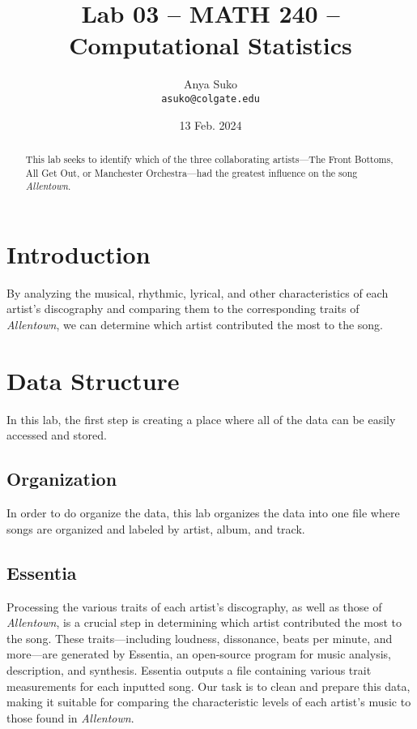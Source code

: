 \documentclass{article}\usepackage[]{graphicx}\usepackage[]{xcolor}
\begin{document}
\vspace{-1in}
\title{Lab 03 -- MATH 240 -- Computational Statistics}

\author{
  Anya Suko \\
  {\tt asuko@colgate.edu}
}

\date{13 Feb. 2024}

\maketitle

\begin{multicols}{2}
\begin{abstract}
This lab seeks to identify which of the three collaborating artists—The Front Bottoms, All Get Out, or Manchester Orchestra—had the greatest influence on the song \emph{Allentown}.
\end{abstract}

\section{Introduction}
By analyzing the musical, rhythmic, lyrical, and other characteristics of each artist’s discography and comparing them to the corresponding traits of \emph{Allentown}, we can determine which artist contributed the most to the song.

\section{Data Structure}
In this lab, the first step is creating a place where all of the data can be easily accessed and stored. 

\subsection{Organization}
In order to do organize the data, this lab organizes the data into one file where songs are organized and labeled by artist, album, and track.

\subsection{Essentia}
Processing the various traits of each artist’s discography, as well as those of \emph{Allentown}, is a crucial step in determining which artist contributed the most to the song. These traits—including loudness, dissonance, beats per minute, and more—are generated by Essentia, an open-source program for music analysis, description, and synthesis. Essentia outputs a file containing various trait measurements for each inputted song. Our task is to clean and prepare this data, making it suitable for comparing the characteristic levels of each artist’s music to those found in \emph{Allentown}.


\end{multicols}
\end{document}
